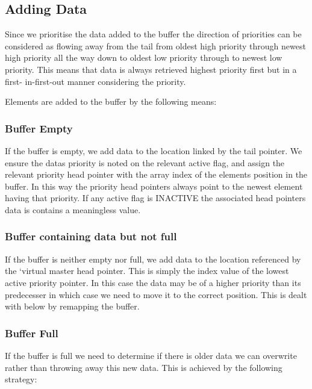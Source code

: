 \subsection*{Adding Data}

Since we prioritise the data added to the buffer the direction of priorities can be considered as flowing away from the tail from oldest high priority through newest high priority all the way down to oldest low priority through to newest low priority. This means that data is always retrieved highest priority first but in a first-\/ in-\/first-\/out manner considering the priority.

Elements are added to the buffer by the following means\+:

\subsubsection*{Buffer Empty}

If the buffer is empty, we add data to the location linked by the tail pointer. We ensure the data\textquotesingle{}s priority is noted on the relevant active flag, and assign the relevant priority head pointer with the array index of the element\textquotesingle{}s position in the buffer. In this way the priority head pointers always point to the newest element having that priority. If any active flag is I\+N\+A\+C\+T\+I\+VE the associated head pointer\textquotesingle{}s data is contains a meaningless value.

\subsubsection*{Buffer containing data but not full}

If the buffer is neither empty nor full, we add data to the location referenced by the `virtual master head\textquotesingle{} pointer. This is simply the index value of the lowest active priority pointer. In this case the data may be of a higher priority than its predecesser in which case we need to move it to the correct position. This is dealt with below by remapping the buffer.

\subsubsection*{Buffer Full}

If the buffer is full we need to determine if there is older data we can overwrite rather than throwing away this new data. This is achieved by the following strategy\+:


